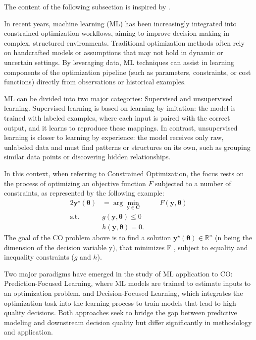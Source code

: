 The content of the following subsection is inspired by \cite{mandiDecisionFocusedLearningFoundations2024}.

In recent years, machine learning (ML) has been increasingly integrated into constrained optimization workflows, aiming to improve decision-making in complex, structured environments. Traditional optimization methods often rely on handcrafted models or assumptions that may not hold in dynamic or uncertain settings. By leveraging data, ML techniques can assist in learning components of the optimization pipeline (such as parameters, constraints, or cost functions) directly from observations or historical examples.

ML can be divided into two major categories: Supervised and unsupervised learning. Supervised learning is based on learning by imitation: the model is trained with labeled examples, where each input is paired with the correct output, and it learns to reproduce these mappings. In contrast, unsupervised learning is closer to learning by experience: the model receives only raw, unlabeled data and must find patterns or structures on its own, such as grouping similar data points or discovering hidden relationships.

In this context, when referring to Constrained Optimization, the focus rests on the process of optimizing an objective function \(F\) subjected to a number of constraints, as represented by the following example:
\begin{alignat}{2}
    \mathbf{y}^\star(\mathbf{\theta}) &= \arg\min_{\mathbf{y \in C}} \quad &&F(\mathbf{y}, \mathbf{\theta}) \tag{3a} \\
    \text{s.t.} \quad &g(\mathbf{y}, \mathbf{\theta}) \leq 0 \quad &&\tag{3b} \\
    &h(\mathbf{y}, \mathbf{\theta}) = 0. &&\tag{3c}
\end{alignat}
The goal of the CO problem above is to find a solution \(\mathbf{y}^\star(\mathbf{\theta}) \in \mathbb{R}^n\) (n being the dimension of the decision variable y), that minimizes F , subject to equality and inequality constraints (\(g\) and \(h\)).

Two major paradigms have emerged in the study of ML application to CO: Prediction-Focused Learning, where ML models are trained to estimate inputs to an optimization problem, and Decision-Focused Learning, which integrates the optimization task into the learning process to train models that lead to high-quality decisions. Both approaches seek to bridge the gap between predictive modeling and downstream decision quality but differ significantly in methodology and application.

